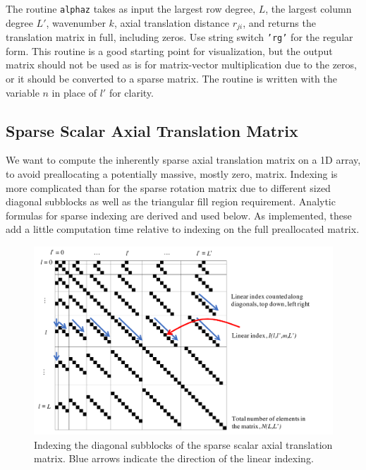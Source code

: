 The routine \texttt{alphaz} takes as input the largest row degree, $L$, the largest column degree $L'$, wavenumber $k$, axial translation distance $r_{ji}$, and returns the translation matrix in full, including zeros.  Use string switch \texttt{'rg'} for the regular form. This routine is a good starting point for visualization, but the output matrix should not be used as is for matrix-vector multiplication due to the zeros, or it should be converted to a sparse matrix. The routine is written with the variable $n$ in place of $l'$ for clarity. 

{\footnotesize
{}
}


\clearpage
\subsection{Sparse Scalar Axial Translation Matrix}

We want to compute the inherently sparse axial translation matrix on a 1D array, to avoid preallocating a potentially massive, mostly zero, matrix. Indexing is more complicated than for the sparse rotation matrix due to different sized diagonal subblocks as well as the triangular fill region requirement. Analytic formulas for sparse indexing are derived and used below. As implemented, these add a little computation time relative to indexing on the full preallocated matrix. 

\begin{figure}[H] 
  \centering
 \includegraphics[width=5.5in]{Translation/Figures/sparseindex_2} 
   \caption{Indexing the diagonal subblocks of the sparse scalar axial translation matrix. Blue arrows indicate the direction of the linear indexing.  }
   \label{fig2translation}
\end{figure}


